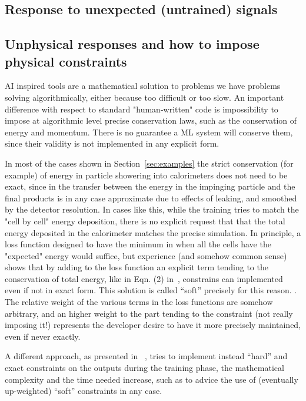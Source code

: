 \subsection{Response to unexpected (untrained) signals}
\subsection{Unphysical responses and how to impose physical constraints}
\label{subsec:physical}
AI inspired tools are a mathematical solution to problems we have problems solving algorithmically, either because too difficult or too slow.
An important difference with respect to standard "human-written" code is impossibility to impose at algorithmic level precise conservation laws, such as the conservation of energy and momentum.
There is no guarantee a ML system will conserve them, since their validity is not implemented in any explicit form.

In most of the cases shown in Section~\ref{sec:examples} the strict conservation (for example) of energy in particle showering into calorimeters does not need to be exact, since in the transfer  between the energy in the impinging particle and the final products is in any case approximate due to effects of leaking, and smoothed by the detector resolution. In cases like this, while the training tries to  match the "cell by cell" energy deposition, there is no explicit request that that the total energy deposited in the calorimeter matches the precise simulation. In principle, a loss function designed to have the minimum in when all the cells have the "expected" energy would suffice, but experience (and somehow common sense) shows that by adding to the loss function an explicit term tending to the conservation of total energy, like in Eqn. (2) in~\cite{calogan}, constrains can implemented even if not in exact form. This solution is called ``soft'' precisely for this reason. .
The relative weight of the various terms in the loss functions are somehow arbitrary, and an higher weight to the part tending to the constraint (not really imposing it!) represents the developer desire to have it more precisely maintained, even if never exactly.

A different approach, as  presented in ~\cite{salzmann}, tries to implement instead ``hard'' and exact constraints on the outputs during the training  phase, the mathematical complexity and the time needed increase, such as to advice the use of (eventually up-weighted)  ``soft'' constraints in any case.

